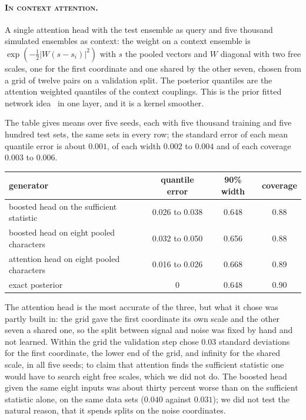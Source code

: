\paragraph{\normalfont\scshape In context attention.} A single attention head with the test ensemble as query and five thousand simulated ensembles as context: the weight on a context ensemble is $\exp(-\frac12|W(s-s_i)|^2)$ with $s$ the pooled vectors and $W$ diagonal with two free scales, one for the first coordinate and one shared by the other seven, chosen from a grid of twelve pairs on a validation split. The posterior quantiles are the attention weighted quantiles of the context couplings. This is the prior fitted network idea~\cite{MHAGH22} in one layer, and it is a kernel smoother.

The table gives means over five seeds, each with five thousand training and five hundred test sets, the same sets in every row; the standard error of each mean quantile error is about $0.001$, of each width $0.002$ to $0.004$ and of each coverage $0.003$ to $0.006$.

\begin{center}
\small
\begin{tabular}{lccc}
\toprule
generator & quantile error & 90\% width & coverage \\ \midrule
boosted head on the sufficient statistic & 0.026 to 0.038 & 0.648 & 0.88 \\
boosted head on eight pooled characters & 0.032 to 0.050 & 0.656 & 0.88 \\
attention head on eight pooled characters & 0.016 to 0.026 & 0.668 & 0.89 \\
exact posterior & 0 & 0.648 & 0.90 \\
\bottomrule
\end{tabular}
\end{center}

The attention head is the most accurate of the three, but what it chose was partly built in: the grid gave the first coordinate its own scale and the other seven a shared one, so the split between signal and noise was fixed by hand and not learned. Within the grid the validation step chose $0.03$ standard deviations for the first coordinate, the lower end of the grid, and infinity for the shared scale, in all five seeds; to claim that attention finds the sufficient statistic one would have to search eight free scales, which we did not do. The boosted head given the same eight inputs was about thirty percent worse than on the sufficient statistic alone, on the same data sets ($0.040$ against $0.031$); we did not test the natural reason, that it spends splits on the noise coordinates.

